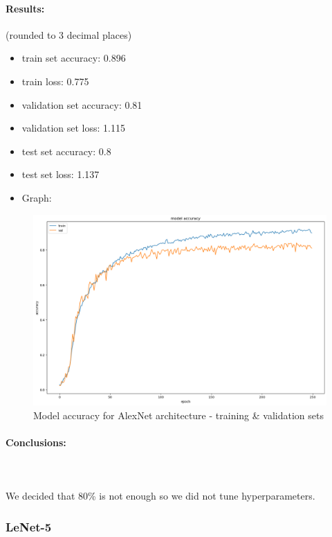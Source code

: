 \documentclass[12pt]{article}
\begin{document}
        \paragraph{Results:} (rounded to 3 decimal places)
          \begin{itemize}
            \item train set accuracy: 0.896
            \item train loss: 0.775
            \item validation set accuracy: 0.81
            \item validation set loss: 1.115
            \item test set accuracy: 0.8
            \item test set loss: 1.137
            \item Graph:
          \end{itemize}
              \begin{figure}[H]
                \includegraphics[width=\linewidth]{images/alex-net.png}
                \caption{Model accuracy for AlexNet architecture - training \& validation sets}
                \label{fig:alex-net}
              \end{figure}
        \paragraph{Conclusions:} \mbox{} \\\\
        We decided that 80\% is not enough so we did not tune hyperparameters.
      \subsubsection{LeNet-5}
\end{document}
